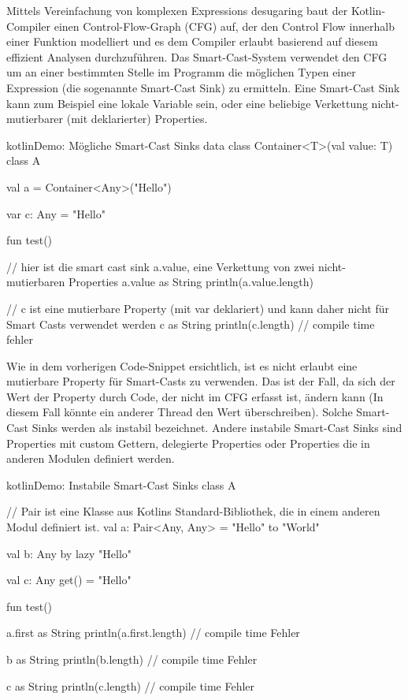 Mittels Vereinfachung von komplexen Expressions \bzw desugaring baut der Kotlin-Compiler einen Control-Flow-Graph (CFG)
auf, der den Control Flow innerhalb einer Funktion modelliert und es dem Compiler erlaubt basierend auf diesem effizient
Analysen durchzuführen.
Das Smart-Cast-System verwendet den CFG um an einer bestimmten Stelle im Programm die möglichen Typen einer Expression
(die sogenannte Smart-Cast Sink) zu ermitteln.
Eine Smart-Cast Sink kann zum Beispiel eine lokale Variable sein, oder eine beliebige Verkettung nicht-mutierbarer
(mit  deklarierter) Properties.

\begin{codeBlock}{kotlin}{Demo: Mögliche Smart-Cast Sinks}
data class Container<T>(val value: T)
class A {

    val a = Container<Any>("Hello")

    var c: Any = "Hello"

    fun test() {
        // hier ist die smart cast sink a.value, eine Verkettung von zwei nicht-mutierbaren Properties
        a.value as String
        println(a.value.length)

        // c ist eine mutierbare Property (mit var deklariert) und kann daher nicht für Smart Casts verwendet werden
        c as String
        println(c.length) // compile time fehler
    }
}
\end{codeBlock}

Wie in dem vorherigen Code-Snippet ersichtlich, ist es nicht erlaubt eine mutierbare Property für Smart-Casts zu
verwenden.
Das ist der Fall, da sich der Wert der Property durch Code, der nicht im CFG erfasst ist, ändern kann (In diesem Fall
könnte ein anderer Thread den Wert überschreiben).
Solche Smart-Cast Sinks werden als instabil bezeichnet.
Andere instabile Smart-Cast Sinks sind \zB Properties mit custom Gettern, delegierte Properties oder Properties die
in anderen Modulen definiert werden.

\begin{codeBlock}{kotlin}{Demo: Instabile Smart-Cast Sinks}
class A {

    // Pair ist eine Klasse aus Kotlins Standard-Bibliothek, die in einem anderen Modul definiert ist.
    val a: Pair<Any, Any> = "Hello" to "World"

    val b: Any by lazy {
        "Hello"
    }

    val c: Any
        get() = "Hello"

    fun test() {
        a.first as String
        println(a.first.length) // compile time Fehler

        b as String
        println(b.length) // compile time Fehler

        c as String
        println(c.length) // compile time Fehler
    }

}
\end{codeBlock}

